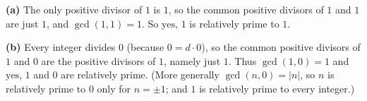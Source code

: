 \textbf{(a)} The only positive divisor of $1$ is $1$, so the common positive divisors of $1$ and $1$ are just $1$, and $\gcd(1,1)=1$. So $\boxed{\text{yes}}$, $1$ is relatively prime to $1$.

\textbf{(b)} Every integer divides $0$ (because $0=d\cdot0$), so the common positive divisors of $1$ and $0$ are the positive divisors of $1$, namely just $1$. Thus $\gcd(1,0)=1$ and $\boxed{\text{yes}}$, $1$ and $0$ are relatively prime. (More generally $\gcd(n,0)=|n|$, so $n$ is relatively prime to $0$ only for $n=\pm1$; and $1$ is relatively prime to every integer.)
